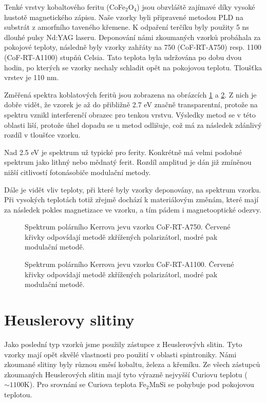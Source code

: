 Tenké vrstvy kobaltového feritu (CoFe$_2$O$_4$) jsou obzvláště zajímavé díky vysoké hustotě magnetického zápisu.
Naše vzorky byli připravené metodou PLD na substrát z amorfního taveného křemene. K odpaření terčíku byly použity 5 ns dlouhé pulsy Nd:YAG laseru. 
Deponování námi zkoumaných vzorků probáhala za pokojové teploty, následně byly vzorky zahřáty na 750 (CoF-RT-A750) resp. 1100 (CoF-RT-A1100) 
stupňů Celsia. Tato teplota byla udržována po dobu dvou hodin, po kterých se vzorky nechaly schladit opět na pokojovou teplotu. Tloušťka vrstev je 110 nm.

Změřená spektra koblatových feritů jsou zobrazena na obrázcích \ref{sCoF-RT-A750} a \ref{sCoF-RT-A1100}. Z nich je dobře vidět, že vzorek je až do přibližně 2.7 eV značně transparentní, protože na spektru vznikl interferenčí obrazec pro tenkou vrstvu. Výsledky metod se v této oblasti liší, protože úhel dopadu se u metod odlišuje, což má za následek zdánlivý rozdíl 
v tloušťce vzorku. 

Nad 2.5 eV je spektrum už typické pro ferity. Konkrétně má velmi podobné spektrum jako lithný nebo mědnatý ferit. \cite{ferity} 
Rozdíl amplitud je dán již zmíněnou nižší citlivostí fotonásobiče modulační metody.

Dále je vidět vliv teploty, při které byly vzorky deponovány, na spektrum vzorku. Při vysokých teplotách totiž zřejmě dochází k materiálovým změnám, které mají za následek pokles magnetizace ve vzorku, a tím pádem i magnetooptické odezvy.


\begin{figure}

\caption{Spektrum polárního Kerrova jevu vzorku CoF-RT-A750. Červené křivky odpovídají metodě zkřížených polarizátorl, modré pak modulační metodě.}
\label{sCoF-RT-A750}
\end{figure}

\begin{figure}

\caption{Spektrum polárního Kerrova jevu vzorku CoF-RT-A1100. Červené křivky odpovídají metodě zkřížených polarizátorl, modré pak modulační metodě.}
\label{sCoF-RT-A1100}
\end{figure}

\section{Heuslerovy slitiny}
Jako poslední typ vzorků jsme použily zástupce z Heuslerovývh slitin. Tyto vzorky mají opět 
skvělé vlastnosti pro použití v oblasti spintroniky.  Námi zkoumané slitiny byly různou směsí kobaltu, 
železa a křemíku. Ze všech zástupců zkoumaných Heuslerových slitin mají tyto výrazně nejvyšší Curiovu 
teplotu ($\sim 1100$K). Pro srovnání se Curiova teplota Fe$_2$MnSi se pohybuje pod pokojovou teplotou.

